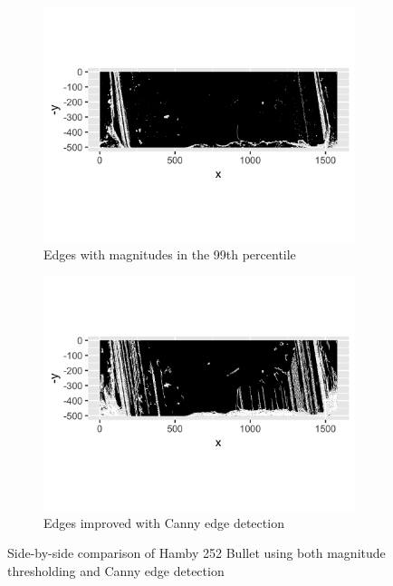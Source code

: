 \documentclass[12pt]{article}
\theoremstyle{nonumberplain}
\begin{document}
\begin{figure}[!ht]
    \centering
    \begin{subfigure}{.5\textwidth}
      \centering
      \includegraphics[width = .9\textwidth]{../images/Hamby252_Bullet1_Land3_Strong_edge.png}
      \caption{Edges with magnitudes in the 99th percentile}
      \label{fig: edge1}
      \end{subfigure}%
    \begin{subfigure}{.5\textwidth}
      \centering
      \includegraphics[width = .9\textwidth]{../images/Hamby252_Bullet1_Land3_Canny_Edge.png}
      \caption{Edges improved with Canny edge detection}
      \label{fig: edge2}
      \end{subfigure}
      \caption{Side-by-side comparison of Hamby 252 Bullet using both magnitude thresholding and Canny edge detection}
      \label{fig: canny}
\end{figure}
\end{document}

